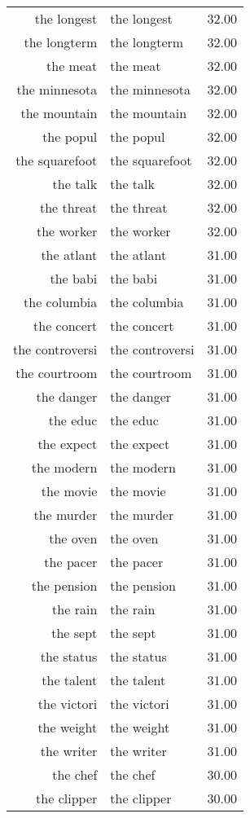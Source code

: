 \begin{table}[ht]
\begin{tabular}{rlr}
  the longest & the longest & 32.00 \\ 
  the longterm & the longterm & 32.00 \\ 
  the meat & the meat & 32.00 \\ 
  the minnesota & the minnesota & 32.00 \\ 
  the mountain & the mountain & 32.00 \\ 
  the popul & the popul & 32.00 \\ 
  the squarefoot & the squarefoot & 32.00 \\ 
  the talk & the talk & 32.00 \\ 
  the threat & the threat & 32.00 \\ 
  the worker & the worker & 32.00 \\ 
  the atlant & the atlant & 31.00 \\ 
  the babi & the babi & 31.00 \\ 
  the columbia & the columbia & 31.00 \\ 
  the concert & the concert & 31.00 \\ 
  the controversi & the controversi & 31.00 \\ 
  the courtroom & the courtroom & 31.00 \\ 
  the danger & the danger & 31.00 \\ 
  the educ & the educ & 31.00 \\ 
  the expect & the expect & 31.00 \\ 
  the modern & the modern & 31.00 \\ 
  the movie & the movie & 31.00 \\ 
  the murder & the murder & 31.00 \\ 
  the oven & the oven & 31.00 \\ 
  the pacer & the pacer & 31.00 \\ 
  the pension & the pension & 31.00 \\ 
  the rain & the rain & 31.00 \\ 
  the sept & the sept & 31.00 \\ 
  the status & the status & 31.00 \\ 
  the talent & the talent & 31.00 \\ 
  the victori & the victori & 31.00 \\ 
  the weight & the weight & 31.00 \\ 
  the writer & the writer & 31.00 \\ 
  the chef & the chef & 30.00 \\ 
  the clipper & the clipper & 30.00 \\ 

\end{tabular}
\end{table}
